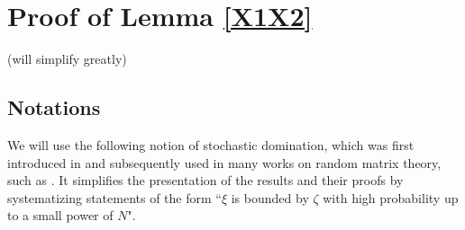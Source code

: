 \appendix

\section{Proof of Lemma \ref{X1X2}} %

(\cor will simplify greatly\nc)

\subsection{Notations}

%

We will use the following notion of stochastic domination, which was first introduced in \cite{Average_fluc} and subsequently used in many works on random matrix theory, such as \cite{isotropic,principal,local_circular,Delocal,Semicircle,Anisotropic}. It simplifies the presentation of the results and their proofs by systematizing statements of the form ``$\xi$ is bounded by $\zeta$ with high probability up to a small power of $N$".

